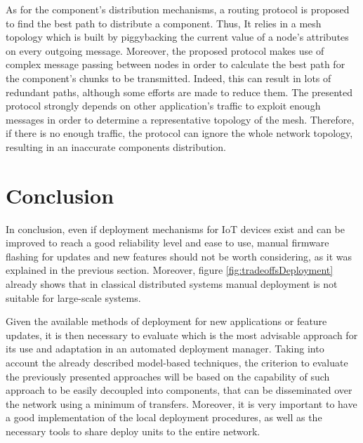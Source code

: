 \begin{description}
	As for the component's distribution mechanisms, a routing protocol is proposed to find the best path to distribute a component.
	Thus, It relies in a mesh topology which is built by piggybacking the current value of a node's attributes on every outgoing message.
	Moreover, the proposed protocol makes use of complex message passing between nodes in order to calculate the best path for the component's chunks to be transmitted.
	Indeed, this can result in lots of redundant paths, although some efforts are made to reduce them.
	The presented protocol strongly depends on other application's traffic to exploit enough messages in order to determine a representative topology of the mesh.
	Therefore, if there is no enough traffic, the protocol can ignore the whole network topology, resulting in an inaccurate components distribution.
\end{description}



\section{Conclusion}
In conclusion, even if deployment mechanisms for IoT devices exist and can be improved to reach a good reliability level and ease to use, manual firmware flashing for updates and new features should not be worth considering, as it was explained in the previous section.
Moreover, figure \ref{fig:tradeoffsDeployment} already shows that in classical distributed systems manual deployment is not suitable for large-scale systems.

Given the available methods of deployment for new applications or feature updates, it is then necessary to evaluate which is the most advisable approach for its use and adaptation in an automated deployment manager.
Taking into account the already described model-based techniques, the criterion to evaluate the previously presented approaches will be based on the capability of such approach to be easily decoupled into components, that can be disseminated over the network using a minimum of transfers.
Moreover, it is very important to have a good implementation of the local deployment procedures, as well as the necessary tools to share deploy units to the entire network.


